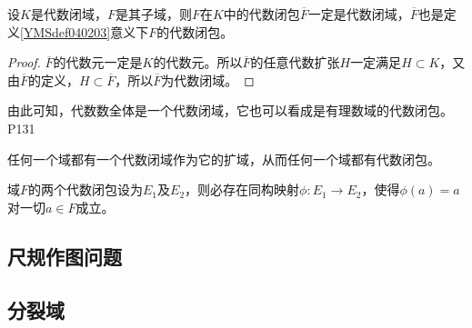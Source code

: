 \begin{theorem}
	设$K$是代数闭域，$F$是其子域，则$F$在$K$中的代数闭包$\overline{F}$一定是代数闭域，$\overline{F}$也是定义\ref{YMSdef040203}意义下$F$的代数闭包。
\end{theorem}

\begin{proof}
	$\overline{F}$的代数元一定是$K$的代数元。所以$\overline{F}$的任意代数扩张$H$一定满足$H\subset K$，又由$\overline{F}$的定义，$H\subset \overline{F}$，所以$\overline{F}$为代数闭域。
\end{proof}

\original
{
	由此可知，代数数全体是一个代数闭域，它也可以看成是有理数域的代数闭包。
}
{P131}

\begin{theorem}
	任何一个域都有一个代数闭域作为它的扩域，从而任何一个域都有代数闭包。
\end{theorem}


\begin{theorem}
	域$F$的两个代数闭包设为$E_{1}$及$E_{2}$，则必存在同构映射$\phi:E_{1}\rightarrow E_{2}$，使得$\phi(a)=a$对一切$a\in F$成立。
\end{theorem}

\subsection{尺规作图问题}

\subsection{分裂域}




















